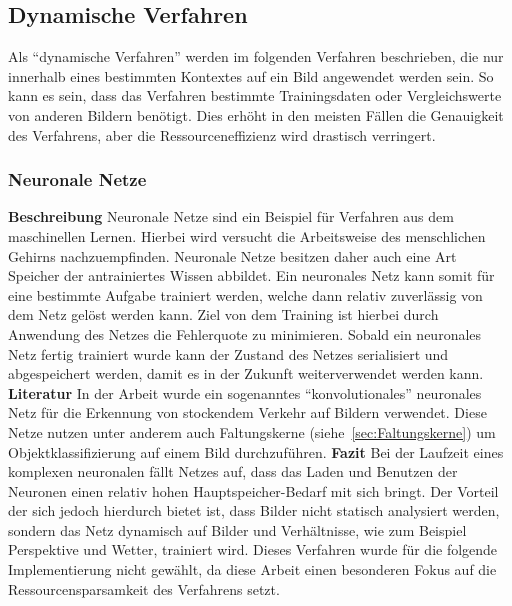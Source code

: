 \subsection{Dynamische Verfahren}
Als "`dynamische Verfahren"' werden im folgenden Verfahren beschrieben, die nur innerhalb eines bestimmten Kontextes auf ein Bild angewendet werden sein. So kann es sein, dass das Verfahren bestimmte Trainingsdaten oder Vergleichswerte von anderen Bildern benötigt. Dies erhöht in den meisten Fällen die Genauigkeit des Verfahrens, aber die Ressourceneffizienz wird drastisch verringert.
\subsubsection{Neuronale Netze}
\textbf{Beschreibung}\newline
Neuronale Netze sind ein Beispiel für Verfahren aus dem maschinellen Lernen.
Hierbei wird versucht die Arbeitsweise des menschlichen Gehirns nachzuempfinden.
Neuronale Netze besitzen daher auch eine Art Speicher der antrainiertes Wissen abbildet.
Ein neuronales Netz kann somit für eine bestimmte Aufgabe trainiert werden, welche dann relativ zuverlässig von dem Netz gelöst werden kann.
Ziel von dem Training ist hierbei durch Anwendung des Netzes die Fehlerquote zu minimieren.
Sobald ein neuronales Netz fertig trainiert wurde kann der Zustand des Netzes serialisiert und abgespeichert werden, damit es in der Zukunft weiterverwendet werden kann.
\newline\newline
\textbf{Literatur}\newline
In der Arbeit \cite{hkkDhbw} wurde ein sogenanntes "`konvolutionales"' neuronales Netz für die Erkennung von stockendem Verkehr auf Bildern verwendet.
Diese Netze nutzen unter anderem auch Faltungskerne (siehe~\ref{sec:Faltungskerne}) um Objektklassifizierung auf einem Bild durchzuführen.
\newline\newline
\textbf{Fazit}\newline
Bei der Laufzeit eines komplexen neuronalen fällt Netzes auf, dass das Laden und Benutzen der Neuronen einen relativ hohen Hauptspeicher-Bedarf mit sich bringt.
Der Vorteil der sich jedoch hierdurch bietet ist, dass Bilder nicht statisch analysiert werden, sondern das Netz dynamisch auf Bilder und Verhältnisse, wie zum Beispiel Perspektive und Wetter, trainiert wird.
Dieses Verfahren wurde für die folgende Implementierung nicht gewählt, da diese Arbeit einen besonderen Fokus auf die Ressourcensparsamkeit des Verfahrens setzt.

